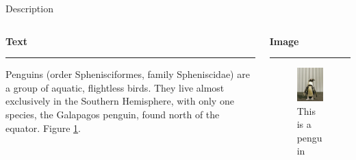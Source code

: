 \documentclass[10pt,fleqn]{beamer}
\begin{document}
\begin{frame}{Description}
    \begin{columns}[T] %
        \begin{column}{.48\textwidth}
            \textbf{Text}
            \color{couleurbarretitreslide}\rule{\linewidth}{2pt} \color{black}
            \newline
            Penguins (order Sphenisciformes, family Spheniscidae) are a group of aquatic, flightless birds. They live almost exclusively in the Southern Hemisphere, with only one species, the Galapagos penguin, found north of the equator. Figure \ref{fig:penguin}.
             
        \end{column}%
        
        \hfill%
        
        \begin{column}{.48\textwidth}
            \textbf{Image}
            \color{couleurbarretitreslide}\rule{\linewidth}{2pt}
            \begin{figure}
                \centering
                \includegraphics[scale=0.3]{img/image.jpg}
                \caption{This is a penguin}
                \label{fig:penguin}
            \end{figure}
            
        \end{column}%
        
    \end{columns}
    
\end{frame}
\end{document}
